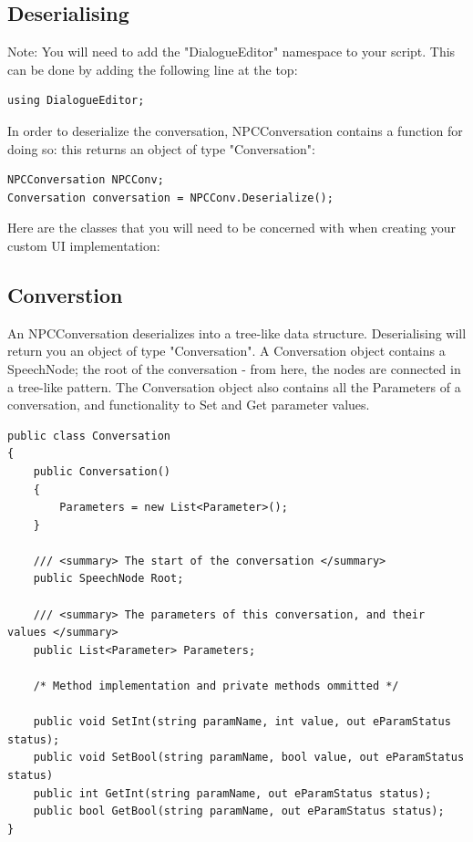 \documentclass[a4paper,12pt]{article}
\begin{document}
\subsection{Deserialising}
Note: You will need to add the "DialogueEditor" namespace to your script. This can be done by adding the following line at the top:
\bigskip

\begin{lstlisting}
using DialogueEditor;
\end{lstlisting}
\bigskip

In order to deserialize the conversation, NPCConversation contains a function for doing so: this returns an object of type "Conversation":
\bigskip

\begin{lstlisting}
NPCConversation NPCConv;
Conversation conversation = NPCConv.Deserialize();
\end{lstlisting}
\bigskip

Here are the classes that you will need to be concerned with when creating your custom UI implementation: 


\subsection{Converstion}
An NPCConversation deserializes into a tree-like data structure. Deserialising will return you an object of type "Conversation". A Conversation object contains a SpeechNode; the root of the conversation - from here, the nodes are connected in a tree-like pattern. The Conversation object also contains all the Parameters of a conversation, and functionality to Set and Get parameter values. 
\begin{lstlisting}
public class Conversation
{
	public Conversation()
	{
		Parameters = new List<Parameter>();
	}

	/// <summary> The start of the conversation </summary>
	public SpeechNode Root;

	/// <summary> The parameters of this conversation, and their values </summary>
	public List<Parameter> Parameters;

	/* Method implementation and private methods ommitted */

	public void SetInt(string paramName, int value, out eParamStatus status);
	public void SetBool(string paramName, bool value, out eParamStatus status)
	public int GetInt(string paramName, out eParamStatus status);	
	public bool GetBool(string paramName, out eParamStatus status);
}
\end{lstlisting}
\newpage
\end{document}
